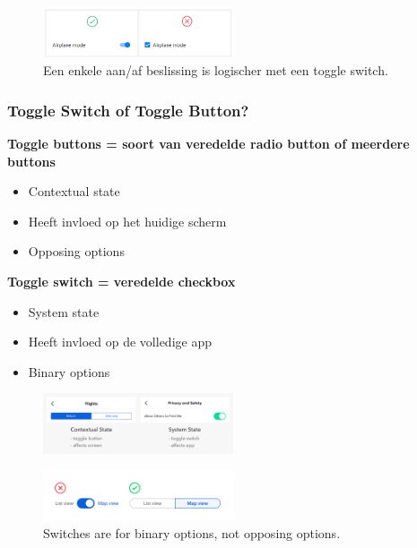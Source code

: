 \documentclass{article}
\newcommand{\bold}[1]{\textbf{#1}}
\begin{document}
\begin{figure}[H]
    \centering
    \includegraphics[width=0.5\textwidth]{toggle-ex-7.png}
    \caption{Een enkele aan/af beslissing is logischer met een toggle switch.}
\end{figure}

\subsubsection{Toggle Switch of Toggle Button?}

\bold{Toggle buttons = soort van veredelde radio button of meerdere buttons}

\begin{itemize}
    \item Contextual state
    \item Heeft invloed op het huidige scherm
    \item Opposing options
\end{itemize}


\bold{Toggle switch = veredelde checkbox}
\begin{itemize}
    \item System state
    \item Heeft invloed op de volledige app
    \item Binary options
\end{itemize}

\begin{figure}[H]
    \centering
    \includegraphics[width=0.5\textwidth]{toggle-buttons.png}
    \caption{}
\end{figure}

\begin{figure}[H]
    \centering
    \includegraphics[width=0.5\textwidth]{toggle-buttons2.png}
    \caption{Switches are for binary options, not opposing options.}
\end{figure}
\end{document}
